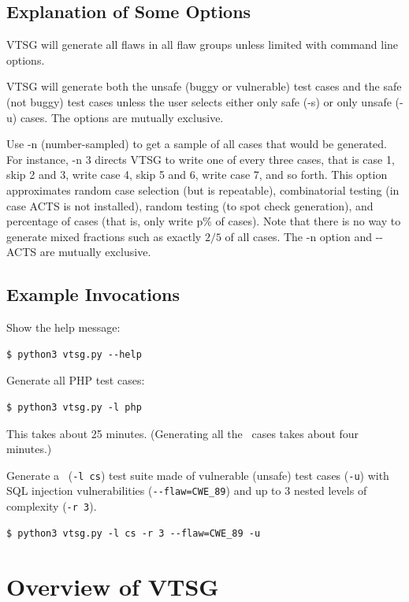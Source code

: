\subsection{Explanation of Some Options}

VTSG will generate all flaws in all flaw groups unless limited with
command line options.

VTSG will generate both the unsafe (buggy or vulnerable)
test cases and the safe (not buggy) test cases unless the user selects
either only safe (-s) or only unsafe (-u) cases.  The options are
mutually exclusive.

Use -n (number-sampled) to get a sample of all cases that would be generated.
For instance, -n 3 directs VTSG to write one of every three cases, that is case
1, skip 2 and 3, write case
4, skip 5 and 6, write case 7, and so forth.  This option approximates random
case selection (but is repeatable), combinatorial testing (in case ACTS is not
installed), random testing (to spot check generation), and percentage of cases
(that is, only write p\% of cases).  Note that there is no way to generate mixed
fractions such as exactly $2/5$ of all cases.  The -n option and -\zws-ACTS are
mutually exclusive.

\subsection{Example Invocations}

Show the help message:
\begin{verbatim}
$ python3 vtsg.py --help
\end{verbatim}

Generate all PHP test cases:
\begin{verbatim}
$ python3 vtsg.py -l php
\end{verbatim}

This takes about 25 minutes.  (Generating all the \CSharp\ cases takes about four
minutes.)

Generate a \CSharp\ (\verb|-l cs|) test suite made of vulnerable (unsafe) test
cases (\verb|-u|) with SQL injection vulnerabilities (\verb|--flaw=CWE_89|)
and up to 3 nested levels of complexity (\verb|-r 3|).
\begin{verbatim}
$ python3 vtsg.py -l cs -r 3 --flaw=CWE_89 -u
\end{verbatim}
 
\section{Overview of VTSG}

